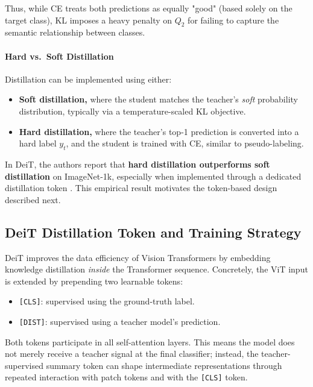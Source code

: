 \noindent
Thus, while CE treats both predictions as equally "good" (based solely on the target class), KL imposes a heavy penalty on $Q_2$ for failing to capture the semantic relationship between classes.

\paragraph{Hard vs.\ Soft Distillation}

\noindent
Distillation can be implemented using either:
\begin{itemize}
	\item \textbf{Soft distillation,} where the student matches the teacher's \emph{soft} probability distribution, typically via a temperature-scaled KL objective.
	\item \textbf{Hard distillation,} where the teacher's top-1 prediction is converted into a hard label \(y_t\), and the student is trained with CE, similar to pseudo-labeling.
\end{itemize}

\noindent
In DeiT, the authors report that \textbf{hard distillation outperforms soft distillation} on ImageNet-1k, especially when implemented through a dedicated distillation token \cite{touvron2021_deit}. This empirical result motivates the token-based design described next.

\subsection{DeiT Distillation Token and Training Strategy}
\label{subsec:chapter18_deit_token}

\noindent
DeiT improves the data efficiency of Vision Transformers by embedding knowledge distillation \emph{inside} the Transformer sequence. Concretely, the ViT input is extended by prepending two learnable tokens:
\begin{itemize}
	\item \texttt{[CLS]}: supervised using the ground-truth label.
	\item \texttt{[DIST]}: supervised using a teacher model's prediction.
\end{itemize}

\noindent
Both tokens participate in all self-attention layers. This means the model does not merely receive a teacher signal at the final classifier; instead, the teacher-supervised summary token can shape intermediate representations through repeated interaction with patch tokens and with the \texttt{[CLS]} token.

